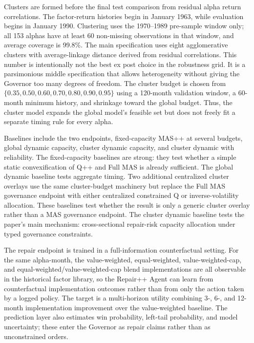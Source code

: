 \documentclass[sigconf,nonacm]{acmart}
\begin{document}
Clusters are formed before the final test comparison from residual alpha return correlations. The factor-return histories begin in January 1963, while evaluation begins in January 1990. Clustering uses the 1970--1989 pre-sample window only; all 153 alphas have at least 60 non-missing observations in that window, and average coverage is 99.8\%. The main specification uses eight agglomerative clusters with average-linkage distance derived from residual correlations. This number is intentionally not the best ex post choice in the robustness grid. It is a parsimonious middle specification that allows heterogeneity without giving the Governor too many degrees of freedom. The cluster budget is chosen from \(\{0.35,0.50,0.60,0.70,0.80,0.90,0.95\}\) using a 120-month validation window, a 60-month minimum history, and shrinkage toward the global budget. Thus, the cluster model expands the global model's feasible set but does not freely fit a separate timing rule for every alpha.

Baselines include the two endpoints, fixed-capacity MAS++ at several budgets, global dynamic capacity, cluster dynamic capacity, and cluster dynamic with reliability. The fixed-capacity baselines are strong: they test whether a simple static convexification of Q++ and Full MAS is already sufficient. The global dynamic baseline tests aggregate timing. Two additional centralized cluster overlays use the same cluster-budget machinery but replace the Full MAS governance endpoint with either centralized constrained Q or inverse-volatility allocation. These baselines test whether the result is only a generic cluster overlay rather than a MAS governance endpoint. The cluster dynamic baseline tests the paper's main mechanism: cross-sectional repair-risk capacity allocation under typed governance constraints.

The repair endpoint is trained in a full-information counterfactual setting. For the same alpha-month, the value-weighted, equal-weighted, value-weighted-cap, and equal-weighted/value-weighted-cap blend implementations are all observable in the historical factor library, so the Repair++ Agent can learn from counterfactual implementation outcomes rather than from only the action taken by a logged policy. The target is a multi-horizon utility combining 3-, 6-, and 12-month implementation improvement over the value-weighted baseline. The prediction layer also estimates win probability, left-tail probability, and model uncertainty; these enter the Governor as repair claims rather than as unconstrained orders.
\end{document}
